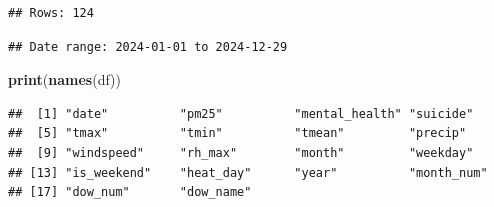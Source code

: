 \documentclass[
]{article}
\newenvironment{Shaded}{\begin{snugshade}}{\end{snugshade}}
\newcommand{\FunctionTok}[1]{\textcolor[rgb]{0.13,0.29,0.53}{\textbf{#1}}}
\newcommand{\NormalTok}[1]{#1}
\newcommand{\SpecialCharTok}[1]{\textcolor[rgb]{0.81,0.36,0.00}{\textbf{#1}}}
\newcommand{\StringTok}[1]{\textcolor[rgb]{0.31,0.60,0.02}{#1}}
\begin{document}
\begin{verbatim}
## Rows: 124
\end{verbatim}

\begin{Shaded}
\end{Shaded}

\begin{verbatim}
## Date range: 2024-01-01 to 2024-12-29
\end{verbatim}

\begin{Shaded}
\begin{Highlighting}[]
\FunctionTok{print}\NormalTok{(}\FunctionTok{names}\NormalTok{(df))}
\end{Highlighting}
\end{Shaded}

\begin{verbatim}
##  [1] "date"          "pm25"          "mental_health" "suicide"      
##  [5] "tmax"          "tmin"          "tmean"         "precip"       
##  [9] "windspeed"     "rh_max"        "month"         "weekday"      
## [13] "is_weekend"    "heat_day"      "year"          "month_num"    
## [17] "dow_num"       "dow_name"
\end{verbatim}
\end{document}
